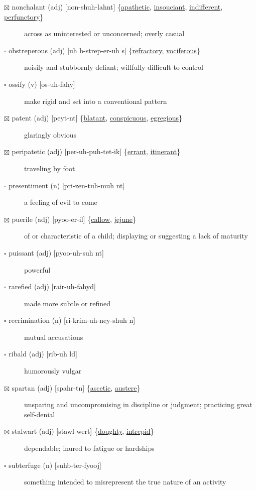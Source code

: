 \documentclass[11pt]{article}
\begin{document}
\begin{description}
\item[{$\boxtimes$ \label{org490ece8} \label{orge75040c}nonchalant (adj) [non-shuh-lahnt] \{\hyperref[org934ecd1]{apathetic}, \hyperref[org2634905]{insouciant}, \hyperref[org1f21a65]{indifferent}, \hyperref[org8561795]{perfunctory}\}}] across as uninterested or unconcerned; overly casual
\item[{$\square$ \label{orgfc4424c}obstreperous (adj) [uh b-strep-er-uh s] \{\hyperref[org5d6471d]{refractory}, \hyperref[org8a41bd3]{vociferous}\}}] noisily and stubbornly defiant; willfully difficult to control
\item[{$\square$ \label{org2092cc9} \label{orgd8421f2}ossify (v) [os-uh-fahy]}] make rigid and set into a conventional pattern
\item[{$\boxtimes$ \label{org70fed6f}patent (adj) [peyt-nt] \{\hyperref[org1b61d78]{blatant}, \hyperref[org6c56ea5]{conspicuous}, \hyperref[org178f47e]{egregious}\}}] glaringly obvious
\item[{$\boxtimes$ \label{org4d2fb07}peripatetic (adj) [per-uh-puh-tet-ik] \{\hyperref[orgcb7fea8]{errant}, \hyperref[orgab898fc]{itinerant}\}}] traveling by foot
\item[{$\square$ presentiment (n) [pri-zen-tuh-muh nt]}] a feeling of evil to come
\item[{$\boxtimes$ \label{org45ddcde}puerile (adj) [pyoo-er-il] \{\hyperref[org46bdddd]{callow}, \hyperref[org2d80182]{jejune}\}}] of or characteristic of a child; displaying or suggesting a lack of maturity
\item[{$\square$ puissant (adj) [pyoo-uh-suh nt]}] powerful
\item[{$\square$ rarefied (adj) [rair-uh-fahyd]}] made more subtle or refined
\item[{$\square$ recrimination (n) [ri-krim-uh-ney-shuh n]}] mutual accusations
\item[{$\square$ ribald (adj) [rib-uh ld]}] humorously vulgar
\item[{$\boxtimes$ \label{orgafdcbd2}spartan (adj) [spahr-tn] \{\hyperref[org219adb4]{ascetic}, \hyperref[orgc3d1739]{austere}\}}] unsparing and uncompromising in discipline or judgment; practicing great self-denial
\item[{$\boxtimes$ \label{org164f71e}stalwart (adj) [stawl-wert] \{\hyperref[org9ada76e]{doughty}, \hyperref[orgbe34286]{intrepid}\}}] dependable; inured to fatigue or hardships
\item[{$\square$ subterfuge (n) [suhb-ter-fyooj]}] something intended to misrepresent the true nature of an activity

\end{description}
\end{document}
